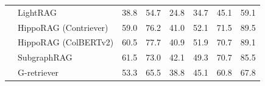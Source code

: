 \begin{table}[]
{\begin{tabular}{@{}c|l|cc|cc|cc@{}}
        \\
                                                       & LightRAG                                     & 38.8                          & 54.7                         & 24.8                      & 34.7          & 45.1          & 59.1          \\
                                                       & HippoRAG (Contriever)                        & 59.0                          & 76.2                         & 41.0                      & 52.1          & 71.5          & 89.5          \\
                                                       & HippoRAG (ColBERTv2)                         & 60.5                          & 77.7                         & 40.9                      & 51.9          & 70.7          & 89.1          \\ 
                                                       & SubgraphRAG                                  & 61.5                          & 73.0                         & 42.1                      & 49.3          & 70.7          & 85.5          \\
                                                       & G-retriever                                   & 53.3                         & 65.5                         & 38.8                     & 45.1        & 60.8         & 67.8         \\


\end{tabular}}
\end{table}
